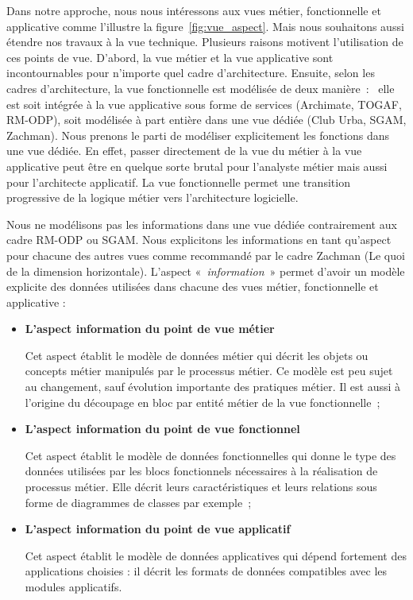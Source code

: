 {Dans notre approche, nous nous intéressons aux vues métier, fonctionnelle et 
applicative comme l'illustre la figure~\ref{fig:vue_aspect}. Mais nous 
souhaitons aussi étendre nos travaux à la vue technique. 
Plusieurs raisons motivent l'utilisation de ces points de vue. D'abord, la vue 
métier et la vue applicative sont incontournables pour n'importe quel cadre 
d'architecture. Ensuite, selon les cadres d'architecture, la vue fonctionnelle 
est modélisée de deux manière~:~ elle est soit intégrée à la vue applicative 
sous forme de services (Archimate, TOGAF, RM-ODP), soit modélisée à part entière 
dans une vue dédiée (Club Urba, SGAM, Zachman). Nous prenons le parti de 
modéliser explicitement les fonctions dans une vue dédiée. En effet, passer 
directement de la vue du métier à la vue applicative peut être en quelque sorte 
brutal pour l'analyste métier mais aussi pour l'architecte applicatif. La vue 
fonctionnelle permet une transition progressive de la logique métier vers 
l'architecture logicielle.

Nous ne modélisons pas les informations dans une vue dédiée contrairement aux 
cadre RM-ODP ou SGAM. Nous explicitons les informations en tant qu'aspect pour 
chacune des autres vues comme recommandé par le cadre Zachman (Le quoi de la 
dimension horizontale). L'aspect «~\textit{information}~» permet d'avoir un 
modèle explicite des données utilisées dans chacune des vues métier, 
fonctionnelle et applicative :
	\begin{itemize}
	\item \textbf{L'aspect information du point de vue métier}
	
	Cet aspect établit le modèle de données métier qui  décrit les objets ou 
concepts métier manipulés par le processus métier. Ce modèle est peu sujet au 
changement, sauf évolution importante des pratiques métier. Il est aussi à 
l'origine du découpage en bloc par entité métier de la vue fonctionnelle~;
	\item \textbf{L'aspect information du point de vue fonctionnel}
	
	Cet aspect établit le modèle de données fonctionnelles qui donne le type des 
données utilisées par les blocs fonctionnels nécessaires à la réalisation de 
processus métier. Elle décrit leurs caractéristiques et leurs relations sous 
forme de diagrammes de classes par exemple~;
	
	\item \textbf{L'aspect information du point de vue applicatif} 
	
	Cet aspect établit le modèle de données applicatives qui dépend fortement des 
applications choisies : il décrit les formats de données compatibles avec les 
modules applicatifs.
	\end{itemize}
	
}
